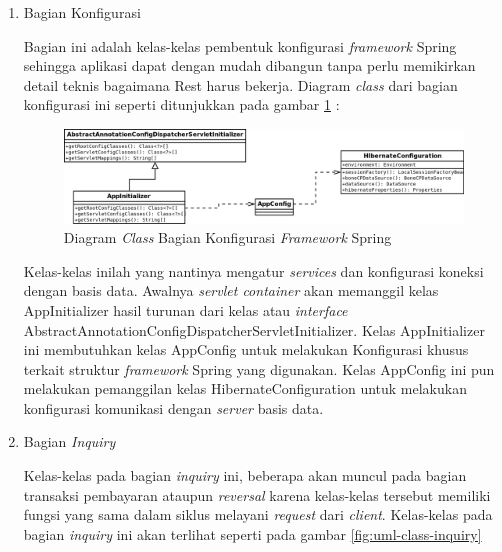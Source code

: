 \begin{enumerate}
  \item Bagian Konfigurasi
  
  Bagian ini adalah kelas-kelas pembentuk konfigurasi \textit{framework} Spring sehingga aplikasi dapat dengan mudah dibangun tanpa perlu memikirkan detail teknis bagaimana Rest harus bekerja. Diagram \textit{class} dari bagian konfigurasi ini seperti ditunjukkan pada gambar \ref{fig:uml-class-konfig} :
  
  \begin{figure}[H]
    \centering
    \includegraphics[width=1\textwidth]{./resources/uml/uml-class-konfig}
    \caption{Diagram \textit{Class} Bagian Konfigurasi \textit{Framework} Spring}
    \label{fig:uml-class-konfig}
  \end{figure}
  
  Kelas-kelas inilah yang nantinya mengatur \textit{services} dan konfigurasi koneksi dengan basis data. Awalnya \textit{servlet container} akan memanggil kelas AppInitializer hasil turunan dari kelas atau \textit{interface} AbstractAnnotationConfigDispatcherServletInitializer. Kelas AppInitializer ini membutuhkan kelas AppConfig untuk melakukan Konfigurasi khusus terkait struktur \textit{framework} Spring yang digunakan. Kelas AppConfig ini pun melakukan pemanggilan kelas HibernateConfiguration untuk melakukan konfigurasi komunikasi dengan \textit{server} basis data.
 
  \item Bagian \textit{Inquiry}
  
  Kelas-kelas pada bagian \textit{inquiry} ini, beberapa akan muncul pada bagian transaksi pembayaran ataupun \textit{reversal} karena kelas-kelas tersebut memiliki fungsi yang sama dalam siklus melayani \textit{request} dari \textit{client}. Kelas-kelas pada bagian \textit{inquiry} ini akan terlihat seperti pada gambar \ref{fig:uml-class-inquiry}
  

\end{enumerate}
